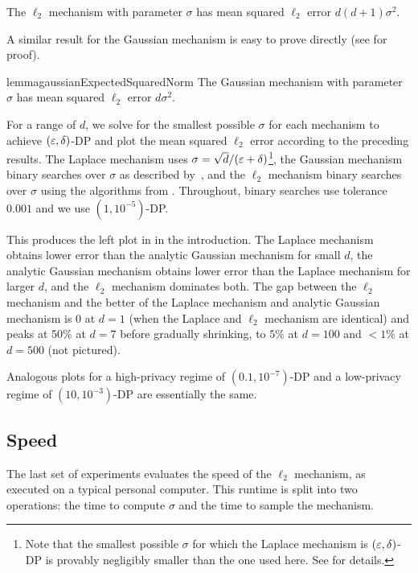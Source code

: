 \begin{corollary}
    The $\ell_2$ mechanism with parameter $\sigma$ has mean squared $\ell_2$ error $d(d+1)\sigma^2$.
\end{corollary}

A similar result for the Gaussian mechanism is easy to prove directly (see  for proof).

\begin{restatable}{lemma}{gaussianExpectedSquaredNorm}
    The Gaussian mechanism with parameter $\sigma$ has mean squared $\ell_2$ error $d\sigma^2$.
\end{restatable}

For a range of $d$, we solve for the smallest possible $\sigma$ for each mechanism to achieve $(\varepsilon, \delta)$-DP and plot the mean squared $\ell_2$ error according to the preceding results. The Laplace mechanism uses $\sigma = \sqrt{d}/(\varepsilon+\delta)$\footnote{Note that the smallest possible $\sigma$ for which the Laplace mechanism is $(\varepsilon, \delta)$-DP is provably negligibly smaller than the one used here. See  for details.}, the Gaussian mechanism binary searches over $\sigma$ as described by~\citet{BW18}, and the $\ell_2$ mechanism binary searches over $\sigma$ using the algorithms from . Throughout, binary searches use tolerance $0.001$ and we use $(1,10^{-5})$-DP.

This produces the left plot in  in the introduction. The Laplace mechanism obtains lower error than the analytic Gaussian mechanism for small $d$, the analytic Gaussian mechanism obtains lower error than the Laplace mechanism for larger $d$, and the $\ell_2$ mechanism dominates both. The gap between the $\ell_2$ mechanism and the better of the Laplace mechanism and analytic Gaussian mechanism is 0 at $d=1$ (when the Laplace and $\ell_2$ mechanism are identical) and peaks at $50\%$ at $d=7$ before gradually shrinking, to $5\%$ at $d=100$ and $<1\%$ at $d = 500$ (not pictured).

Analogous plots for a high-privacy regime of $(0.1, 10^{-7})$-DP and a low-privacy regime of $(10, 10^{-3})$-DP are essentially the same.

\subsection{Speed}
\label{subsec:experiments_speed}
The last set of experiments evaluates the speed of the $\ell_2$ mechanism, as executed on a typical personal computer. This runtime is split into two operations: the time to compute $\sigma$ and the time to sample the mechanism.


